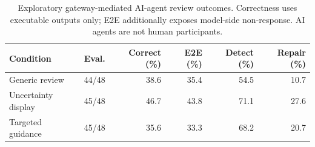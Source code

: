 \begin{table}[t]
\centering
\small
\caption{Exploratory gateway-mediated AI-agent review outcomes. Correctness uses executable outputs only; E2E additionally exposes model-side non-response. AI agents are not human participants.}
\label{tab:gateway_agent_conditions}
\begin{tabular}{lrrrrr}
\toprule
Condition & Eval. & Correct (\%) & E2E (\%) & Detect (\%) & Repair (\%) \\
\midrule
Generic review & 44/48 & 38.6 & 35.4 & 54.5 & 10.7 \\
Uncertainty display & 45/48 & 46.7 & 43.8 & 71.1 & 27.6 \\
Targeted guidance & 45/48 & 35.6 & 33.3 & 68.2 & 20.7 \\
\bottomrule
\end{tabular}
\end{table}
